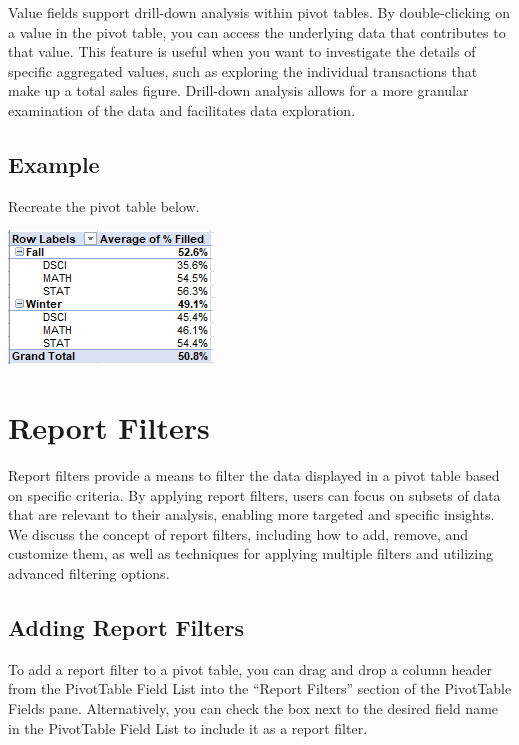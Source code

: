 \documentclass[
]{book}
\begin{document}
Value fields support drill-down analysis within pivot tables. By double-clicking on a value in the pivot table, you can access the underlying data that contributes to that value. This feature is useful when you want to investigate the details of specific aggregated values, such as exploring the individual transactions that make up a total sales figure. Drill-down analysis allows for a more granular examination of the data and facilitates data exploration.

\hypertarget{example-2}{%
\subsection{Example}\label{example-2}}

Recreate the pivot table below.

\includegraphics{PT6.png}

\hypertarget{report-filters}{%
\section{Report Filters}\label{report-filters}}

Report filters provide a means to filter the data displayed in a pivot table based on specific criteria. By applying report filters, users can focus on subsets of data that are relevant to their analysis, enabling more targeted and specific insights. We discuss the concept of report filters, including how to add, remove, and customize them, as well as techniques for applying multiple filters and utilizing advanced filtering options.

\hypertarget{adding-report-filters}{%
\subsection{Adding Report Filters}\label{adding-report-filters}}

To add a report filter to a pivot table, you can drag and drop a column header from the PivotTable Field List into the ``Report Filters'' section of the PivotTable Fields pane. Alternatively, you can check the box next to the desired field name in the PivotTable Field List to include it as a report filter.
\end{document}
